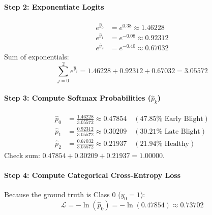 \begin{example}
\paragraph{Step 2: Exponentiate Logits}
\begin{align*}
e^{\hat{y}_0} &= e^{0.38} \approx \mathbf{1.46228} \\
e^{\hat{y}_1} &= e^{-0.08} \approx \mathbf{0.92312} \\
e^{\hat{y}_2} &= e^{-0.40} \approx \mathbf{0.67032}
\end{align*}
Sum of exponentials:
\begin{equation*}
\sum_{j=0}^2 e^{\hat{y}_j} = 1.46228 + 0.92312 + 0.67032 = \mathbf{3.05572}
\end{equation*}

\paragraph{Step 3: Compute Softmax Probabilities ($\hat{p}_k$)}
\begin{align*}
\hat{p}_0 &= \frac{1.46228}{3.05572} \approx \mathbf{0.47854} \quad (47.85\% \text{ Early Blight}) \\
\hat{p}_1 &= \frac{0.92312}{3.05572} \approx \mathbf{0.30209} \quad (30.21\% \text{ Late Blight}) \\
\hat{p}_2 &= \frac{0.67032}{3.05572} \approx \mathbf{0.21937} \quad (21.94\% \text{ Healthy})
\end{align*}
Check sum: $0.47854 + 0.30209 + 0.21937 = 1.00000$.

\paragraph{Step 4: Compute Categorical Cross-Entropy Loss}
Because the ground truth is Class 0 ($y_0 = 1$):
\begin{equation*}
\mathcal{L} = -\ln(\hat{p}_0) = -\ln(0.47854) \approx \mathbf{0.73702}
\end{equation*}


\end{example}
